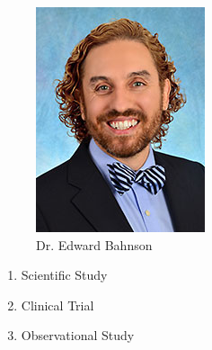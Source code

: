 \documentclass[xcolor=dvipsnames]{beamer}
\begin{document}
\begin{frame}
\begin{minipage}[t]{.3\textwidth}
\end{minipage}\hfill
\begin{minipage}[t]{.3\textwidth}
	\begin{figure}[h!]
		\centering
		\includegraphics[height = 0.65\textwidth]{edward.jpeg}
		\caption*{Dr. Edward Bahnson}
	\end{figure}
\end{minipage}
\vfill
\begin{enumerate}
\item Scientific Study
\vfill
\item {\only<2>{\color{red}}Clinical Trial}
\vfill
\item {Observational Study}
\end{enumerate}
\end{frame}





\end{document}
